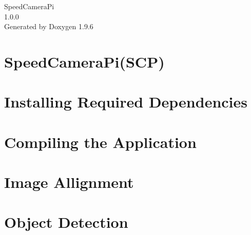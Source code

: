 \documentclass[twoside]{book}
\newcommand{\+}{\discretionary{\mbox{\scriptsize$\hookleftarrow$}}{}{}}
\newcommand{\clearemptydoublepage}{%
    \newpage{\pagestyle{empty}\cleardoublepage}%
  }
\begin{document}
  \raggedbottom
    \hypersetup{pageanchor=false,
                bookmarksnumbered=true,
                pdfencoding=unicode
               }
  \begin{titlepage}
  \vspace*{7cm}
  \begin{center}%
  {\Large Speed\+Camera\+Pi}\\
  [1ex]\large 1.\+0.\+0 \\
  \vspace*{1cm}
  {\large Generated by Doxygen 1.9.6}\\
  \end{center}
  \end{titlepage}
  \clearemptydoublepage
  \tableofcontents
  \clearemptydoublepage
  \hypersetup{pageanchor=true}
\chapter{Speed\+Camera\+Pi(SCP)}
\label{index}\hypertarget{index}{}
\chapter{Installing Required Dependencies}
\label{md__docs_markdown__installing_required_dependency}

\chapter{Compiling the Application}
\label{md__docs_markdown__compiling_programm}

\chapter{Image Allignment}
\label{md__docs_markdown__image_allignment}

\chapter{Object Detection}
\label{md__docs_markdown__object_detection}

\end{document}
